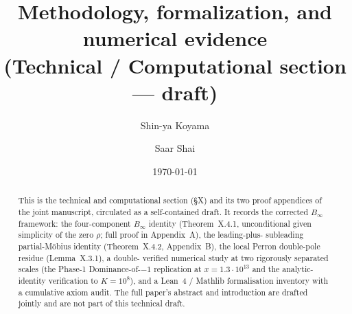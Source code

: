 \documentclass[11pt]{amsart}
\title[Technical / Computational section]{Methodology, formalization, and numerical evidence \\
       \large (Technical / Computational section --- draft)}
\author{Shin-ya Koyama \and Saar Shai}
\date{\today}
\theoremstyle{definition}
\begin{document}
\begin{abstract}
This is the technical and computational section (\S X) and its two
proof appendices of the joint manuscript, circulated as a
self-contained draft. It records the corrected $B_\infty$
framework: the four-component $B_\infty$ identity
(Theorem~X.4.1, unconditional given simplicity of the zero
$\rho$; full proof in Appendix~A), the leading-plus-%
subleading partial-M\"obius identity (Theorem~X.4.2, Appendix~B),
the local Perron double-pole residue (Lemma~X.3.1), a double-%
verified numerical study at two rigorously separated scales (the
Phase-1 Dominance-of-$-1$ replication at $x = 1.3\cdot10^{13}$ and
the analytic-identity verification to $K = 10^{8}$), and a Lean~4
/ Mathlib formalisation inventory with a cumulative axiom audit.
The full paper's abstract and introduction are drafted jointly and
are not part of this technical draft.
\end{abstract}

\maketitle



\appendix



\printbibliography
\end{document}
